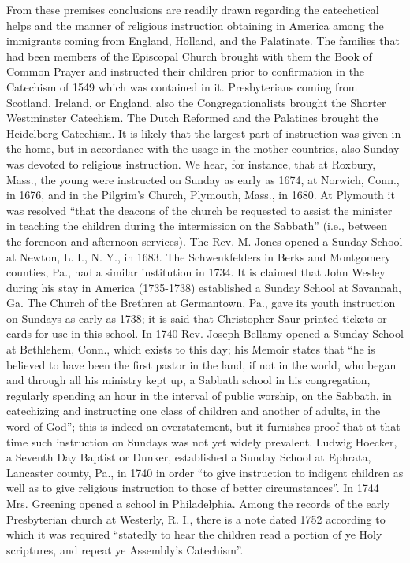 From these premises conclusions are readily drawn regarding the catechetical helps and the manner of religious instruction obtaining in America among the immigrants coming from England, Holland, and the Palatinate. The families that had been members of the Episcopal Church brought with them the Book of Common Prayer and instructed their children prior to confirmation in the Catechism of 1549 which was contained in it. Presbyterians coming from Scotland, Ireland, or England, also the Congregationalists brought the Shorter Westminster Catechism. The Dutch Reformed and the Palatines brought the Heidelberg Catechism. It is likely that the largest part of instruction was given in the home, but in accordance with the usage in the mother countries, also Sunday was devoted to religious instruction. We hear, for instance, that at Roxbury, Mass., the young were instructed on Sunday as early as 1674, at Norwich, Conn., in 1676, and in the Pilgrim’s Church, Plymouth, Mass., in 1680. At Plymouth it was resolved “that the deacons of the church be requested to assist the minister in teaching the children during the intermission on the Sabbath” (i.e., between the
forenoon and afternoon services). The Rev. M. Jones opened a Sunday School at Newton, L. I., N. Y., in 1683. The Schwenkfelders in Berks and Montgomery counties, Pa., had a similar institution in 1734. It is claimed that John Wesley during his stay in America (1735-1738) established a Sunday School at Savannah, Ga. The Church of the Brethren at Germantown, Pa., gave its youth instruction on Sundays as early as 1738; it is said that Christopher Saur printed tickets or cards for use in this school. In 1740 Rev. Joseph Bellamy opened a Sunday School at Bethlehem, Conn., which exists to this day; his Memoir states that “he is believed to have been the first pastor in the land, if not in the world, who began and through all his ministry kept up, a Sabbath school in his congregation, regularly spending an hour in the interval of public worship, on the Sabbath, in catechizing and instructing one class of children and another of adults, in the word of God”; this is indeed an overstatement, but it furnishes proof that at that time such instruction on Sundays was not yet widely prevalent. Ludwig Hoecker, a Seventh Day Baptist or Dunker, established a Sunday School at Ephrata, Lancaster county, Pa., in 1740 in order “to give instruction to indigent children as well as to give religious instruction to those of better circumstances”. In 1744 Mrs. Greening opened a school in Philadelphia. Among the records of the early Presbyterian church at Westerly, R. I., there is a note dated 1752 according to which it was required “statedly to hear the children read a portion of ye Holy scriptures, and repeat ye Assembly’s Catechism”.

